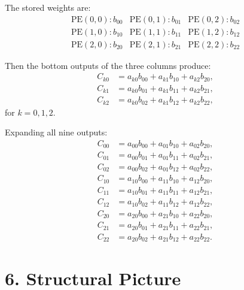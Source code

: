 \documentclass[11pt]{article}
\begin{document}
The stored weights are:
\[
\begin{array}{ccc}
\text{PE}(0,0): b_{00} & \text{PE}(0,1): b_{01} & \text{PE}(0,2): b_{02} \\
\text{PE}(1,0): b_{10} & \text{PE}(1,1): b_{11} & \text{PE}(1,2): b_{12} \\
\text{PE}(2,0): b_{20} & \text{PE}(2,1): b_{21} & \text{PE}(2,2): b_{22}
\end{array}
\]

Then the bottom outputs of the three columns produce:
\begin{align*}
C_{k0} &= a_{k0}b_{00} + a_{k1}b_{10} + a_{k2}b_{20}, \\
C_{k1} &= a_{k0}b_{01} + a_{k1}b_{11} + a_{k2}b_{21}, \\
C_{k2} &= a_{k0}b_{02} + a_{k1}b_{12} + a_{k2}b_{22},
\end{align*}
for $k = 0,1,2$.

Expanding all nine outputs:
\begin{align*}
C_{00} &= a_{00}b_{00} + a_{01}b_{10} + a_{02}b_{20}, \\
C_{01} &= a_{00}b_{01} + a_{01}b_{11} + a_{02}b_{21}, \\
C_{02} &= a_{00}b_{02} + a_{01}b_{12} + a_{02}b_{22}, \\
C_{10} &= a_{10}b_{00} + a_{11}b_{10} + a_{12}b_{20}, \\
C_{11} &= a_{10}b_{01} + a_{11}b_{11} + a_{12}b_{21}, \\
C_{12} &= a_{10}b_{02} + a_{11}b_{12} + a_{12}b_{22}, \\
C_{20} &= a_{20}b_{00} + a_{21}b_{10} + a_{22}b_{20}, \\
C_{21} &= a_{20}b_{01} + a_{21}b_{11} + a_{22}b_{21}, \\
C_{22} &= a_{20}b_{02} + a_{21}b_{12} + a_{22}b_{22}.
\end{align*}

\section*{6. Structural Picture}
\end{document}

